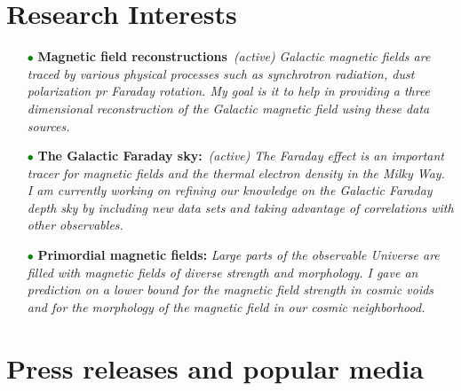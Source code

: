 \documentclass[11pt,a4paper,sans, table, dvipsnames]{moderncv}        %
\begin{document}
\vspace{\baselineskip}
\section{Research Interests}
\begin{itemize}

\item[\textcolor{Green}{$\bullet$}]{\textbf{Magnetic field reconstructions} \,\textit{(active)} \newline \textit{Galactic magnetic fields are traced by various physical processes such as synchrotron radiation, dust polarization pr Faraday rotation. My goal is it to help in providing a three dimensional reconstruction of the Galactic magnetic field using these data sources. }}

\vspace{3pt}

\item[\textcolor{Green}{$\bullet$}]{\textbf{The Galactic Faraday sky:} \,\textit{(active)}  \newline \textit{The Faraday effect is an important tracer for magnetic fields and the thermal electron density in the Milky Way. I am currently working on refining our knowledge on the Galactic Faraday depth sky by including new data sets and taking advantage of correlations with other observables.}}

\vspace{3pt}

\item[\textcolor{Green}{$\bullet$}]{\textbf{Primordial magnetic fields:}  \newline \textit{Large parts of the observable Universe are filled with magnetic fields of diverse strength and morphology. I gave an prediction on a lower bound for the magnetic field strength in cosmic voids and for the morphology of the magnetic field in our cosmic neighborhood. }}
\end{itemize}

\vspace{\baselineskip}
\section{Press releases and popular media}
\end{document}
